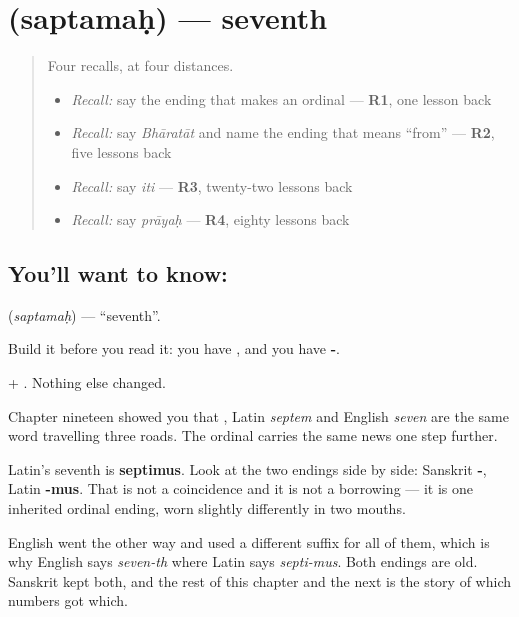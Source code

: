 \section[\texorpdfstring{\sk{सप्तमः} (saptamaḥ)}{सप्तमः (saptamaḥ)}]{ (saptamaḥ) — seventh}

\label{lesson:SA-C62-seventh}



\begin{quote}
Four recalls, at four distances.

\begin{itemize}
\raggedright
  \item \emph{Recall:} say the ending that makes an ordinal — \textbf{R1}, one lesson back
  \item \emph{Recall:} say \emph{Bhāratāt} and name the ending that means \textquotedblleft{}from\textquotedblright{} — \textbf{R2}, five lessons back
  \item \emph{Recall:} say \emph{iti} — \textbf{R3}, twenty-two lessons back
  \item \emph{Recall:} say \emph{prāyaḥ} — \textbf{R4}, eighty lessons back
\end{itemize}
\end{quote}

\subsection*{You'll want to know: }
\textbf{} (\emph{saptamaḥ}) — \textquotedblleft{}seventh\textquotedblright{}.

Build it before you read it: you have \textbf{}, and you have \textbf{-}.

\textbf{} + \textbf{}. Nothing else changed.

\begin{cousinweb}
Chapter nineteen showed you that \textbf{}, Latin \emph{septem} and English \emph{seven} are the same word travelling three roads. The ordinal carries the same news one step further.

Latin's seventh is \textbf{septimus}. Look at the two endings side by side: Sanskrit \textbf{-}, Latin \textbf{-mus}. That is not a coincidence and it is not a borrowing — it is one inherited ordinal ending, worn slightly differently in two mouths.

English went the other way and used a different suffix for all of them, which is why English says \emph{seven-th} where Latin says \emph{septi-mus}. Both endings are old. Sanskrit kept both, and the rest of this chapter and the next is the story of which numbers got which.
\end{cousinweb}


